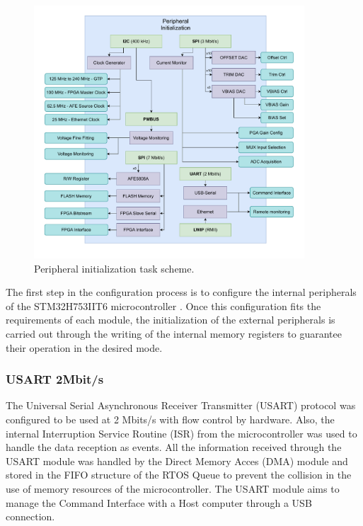 \begin{figure}[htbp]
\centering %
\includegraphics[width=0.9\textwidth,origin=c,angle=0]{Images/PeripheralInitTask.pdf}
\caption{\label{fig:InitPeriTask} Peripheral initialization task scheme.}
\end{figure}

The first step in the configuration process is to configure the internal peripherals of the STM32H753IIT6 microcontroller \cite{stm32h7}. Once this configuration fits the requirements of each module, the initialization of the external peripherals is carried out through the writing of the internal memory registers to guarantee their operation in the desired mode.


\subsubsection{USART 2Mbit/s}

The Universal Serial Asynchronous Receiver Transmitter (USART) protocol was configured to be used at 2 Mbits/s with flow control by hardware. Also, the internal Interruption Service Routine (ISR) from the microcontroller was used to handle the data reception as events. All the information received through the USART module was handled by the Direct Memory Acces (DMA) module and stored in the FIFO structure of the RTOS Queue to prevent the collision in the use of memory resources of the microcontroller. The USART module aims to manage the Command Interface with a Host computer through a USB connection.


